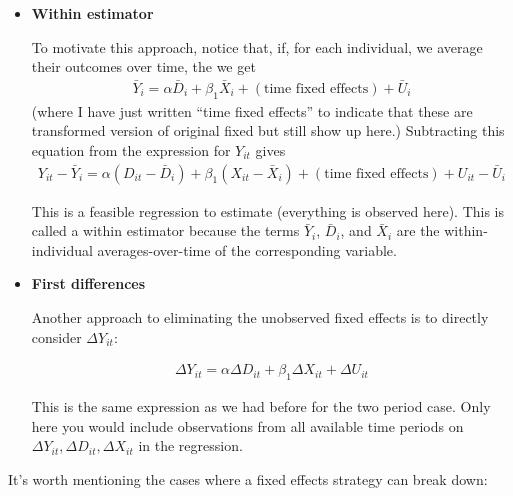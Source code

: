 \documentclass[
  letterpaper,
  DIV=11,
  numbers=noendperiod]{scrreprt}
\begin{document}
\begin{itemize}
\item
  \textbf{Within estimator}

  To motivate this approach, notice that, if, for each individual, we
  average their outcomes over time, the we get \begin{align*}
      \bar{Y}_i = \alpha \bar{D}_i + \beta_1 \bar{X}_i + (\textrm{time fixed effects}) + \bar{U}_i
    \end{align*} (where I have just written ``time fixed effects'' to
  indicate that these are transformed version of original fixed but
  still show up here.) Subtracting this equation from the expression for
  \(Y_{it}\) gives \begin{align*}
      Y_{it} - \bar{Y}_i = \alpha (D_{it} - \bar{D}_i) + \beta_1 (X_{it} - \bar{X}_i) + (\textrm{time fixed effects}) + U_{it} - \bar{U}_i
    \end{align*}

  This is a feasible regression to estimate (everything is observed
  here). This is called a within estimator because the terms
  \(\bar{Y}_i\), \(\bar{D}_i\), and \(\bar{X}_i\) are the
  within-individual averages-over-time of the corresponding variable.
\item
  \textbf{First differences}

  Another approach to eliminating the unobserved fixed effects is to
  directly consider \(\Delta Y_{it}\):

  \begin{align*}
      \Delta Y_{it} = \alpha \Delta D_{it} + \beta_1 \Delta X_{it} + \Delta U_{it}
    \end{align*}

  This is the same expression as we had before for the two period case.
  Only here you would include observations from all available time
  periods on \(\Delta Y_{it}, \Delta D_{it}, \Delta X_{it}\) in the
  regression.
\end{itemize}

It's worth mentioning the cases where a fixed effects strategy can break
down:
\end{document}
